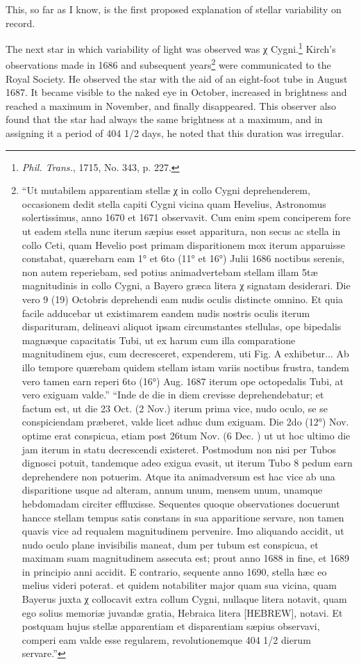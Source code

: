 \documentclass[a4paper, 12pt, oneside, polutonikogreek, english]{article}
\begin{document}
This, so far as I know, is the first proposed explanation of stellar variability on record.

The next star in which variability of light was observed was χ Cygni.\footnote{\emph{Phil. Trans.}, 1715, No. 343, p. 227.} Kirch's observations made in 1686 and subsequent years\footnote{``Ut mutabilem apparentiam stellæ χ in collo Cygni deprehenderem, occasionem dedit stella capiti Cygni vicina quam Hevelius, Astronomus solertissimus, anno 1670 et 1671 observavit. Cum enim spem conciperem fore ut eadem stella nunc iterum sæpius esset apparitura, non secus ac stella in collo Ceti, quam Hevelio post primam disparitionem mox iterum apparuisse constabat, quærebarn eam 1° et 6to (11° et 16°) Julii 1686 noctibus serenis, non autem reperiebam, sed potius animadvertebam stellam illam 5tæ magnitudinis in collo Cygni, a Bayero græca litera χ signatam desiderari. Die vero 9 (19) Octobris deprehendi eam nudis oculis distincte omnino. Et quia facile adducebar ut existimarem eandem nudis nostris oculis iterum disparituram, delineavi aliquot ipsam circumstantes stellulas, ope bipedalis magnæque capacitatis Tubi, ut ex harum cum illa comparatione magnitudinem ejus, cum decresceret, expenderem, uti Fig. A exhibetur... Ab illo tempore quærebam quidem stellam istam variis noctibus frustra, tandem vero tamen earn reperi 6to (16°) Aug. 1687 iterum ope octopedalis Tubi, at vero exiguam valde.'' ``Inde de die in diem crevisse deprehendebatur; et factum est, ut die 23 Oct. (2 Nov.) iterum prima vice, nudo oculo, se se conspiciendam præberet, valde licet adhuc dum exiguam. Die 2do (12°) Nov. optime erat conspicua, etiam post 26tum Nov. (6 Dec. ) ut ut hoc ultimo die jam iterum in statu decrescendi existeret. Postmodum non nisi per Tubos dignosci potuit, tandemque adeo exigua evasit, ut iterum Tubo 8 pedum earn deprehendere non potuerim. Atque ita animadversum est hac vice ab una disparitione usque ad alteram, annum unum, mensem unum, unamque hebdomadam circiter effluxisse. Sequentes quoque observationes docuerunt hancce stellam tempus satis constans in sua apparitione servare, non tamen quavis vice ad requalem magnitudinem pervenire. Imo aliquando accidit, ut nudo oculo plane invisibilis maneat, dum per tubum est conspicua, et maximam suam magnitudinem assecuta est; prout anno 1688 in fine, et 1689 in principio anni accidit. E contrario, sequente anno 1690, stella hæc eo melius videri poterat. et quidem notabiliter major quam sua vicina, quam Bayerus juxta χ collocavit extra collum Cygni, nullaque litera notavit, quam ego solius memoriæ juvandæ gratia, Hebraica litera [HEBREW], notavi. Et postquam hujus stellæ apparentiam et disparentiam sæpius observavi, comperi eam valde esse regularem, revolutionemque 404 1/2 dierum servare.''} were communicated to the Royal Society. He observed the star with the aid of an eight-foot tube in August 1687. It became visible to the naked eye in October, increased in brightness and reached a maximum in November, and finally disappeared. This observer also found that the star had always the same brightness at a maximum, and in assigning it a period of 404 1/2 days, he noted that this duration was irregular.
\end{document}
